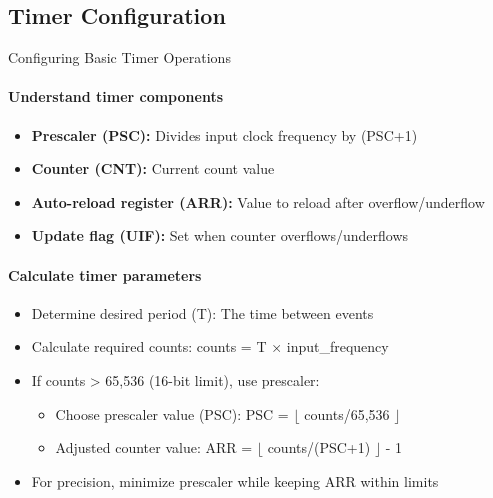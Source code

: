 \subsection{Timer Configuration}

\begin{KR}{Configuring Basic Timer Operations}
\paragraph{Understand timer components}
\begin{itemize}
    \item \textbf{Prescaler (PSC):} Divides input clock frequency by (PSC+1)
    \item \textbf{Counter (CNT):} Current count value
    \item \textbf{Auto-reload register (ARR):} Value to reload after overflow/underflow
    \item \textbf{Update flag (UIF):} Set when counter overflows/underflows
\end{itemize}

\paragraph{Calculate timer parameters}
\begin{itemize}
    \item Determine desired period (T): The time between events
    \item Calculate required counts: counts = T × input\_frequency
    \item If counts > 65,536 (16-bit limit), use prescaler:
    \begin{itemize}
        \item Choose prescaler value (PSC): PSC = $\lfloor$ counts/65,536 $\rfloor$
        \item Adjusted counter value: ARR = $\lfloor$ counts/(PSC+1) $\rfloor$ - 1
    \end{itemize}
    \item For precision, minimize prescaler while keeping ARR within limits
\end{itemize}


\end{KR}
